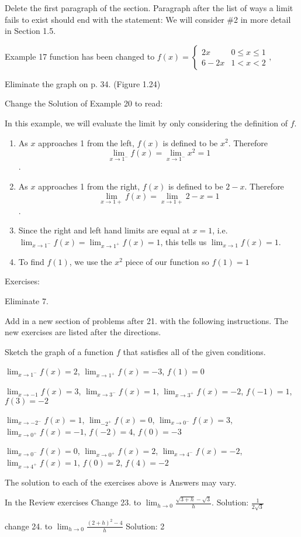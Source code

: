 \documentclass[10pt]{article}
\newcommand{\ds}{\displaystyle}
\begin{document}
Delete the first paragraph of the section.  Paragraph after the list of ways a limit fails to exist should end with the statement: We will consider \#2 in more detail in Section 1.5.  %




Example 17 function has been changed to  $\ds f(x) = \begin{cases} 2x & 0\leq x\leq 1 \\ 6-2x & 1<x<2\end{cases},$

Eliminate the graph on p. 34. (Figure 1.24)

Change the Solution of Example 20 to read:

In this example, we will evaluate the limit by only considering the definition of $f$.
		\begin{enumerate}
		\item		As $x$ approaches 1 from the left, $f(x)$ is defined to be $x^2$. Therefore $$\lim_{x\to1^-} f(x)=\lim_{x\to1^-} x^2=1$$.
		\item		As $x$ approaches 1 from the right, $f(x)$ is defined to be $2-x$. Therefore $$ \lim_{x\to 1+} f(x)=\lim_{x\to 1+} 2-x=1$$.
		\item		Since the right and left hand limits are equal at $x=1$, i.e. $\ds \lim_{x\to1^-} f(x)=\ds \lim_{x\to1^+} f(x)=1$, this tells us $\ds \lim_{x\to1} f(x)=1$.
		\item		To find $f(1)$, we use the $x^2$ piece of our function so $f(1)=1$ 		
		\end{enumerate}


Exercises:

Eliminate 7.


Add in a new section of problems after 21. with the following instructions.  The new exercises are listed after the directions.

Sketch the graph of a function $f$ that satisfies all of the given conditions.

$\ds \lim_{x\to 1^-} f(x)=2$, \quad $\ds \lim_{x\to 1^+} f(x)=-3$, \quad $f(1)=0$

$\ds \lim_{x\to -1} f(x)=3$, \quad $\ds \lim_{x\to 3^-} f(x)=1$, \quad $\ds \lim_{x\to 3^+} f(x)=-2$, \quad $f(-1)=1$, \quad $f(3)=-2$

$\ds \lim_{x\to -2^-} f(x)=1$, \quad  $\ds \lim_{-2^+} f(x)=0$, \quad $\ds \lim_{x\to 0^-} f(x)=3$, \quad $\ds \lim_{x\to 0^+} f(x)=-1$, \quad $f(-2)=4$, \quad $f(0)=-3$

$\ds \lim_{x\to 0^-} f(x)=0$, \quad $\ds \lim_{x\to 0^+} f(x)=2$, \quad $\ds \lim_{x\to 4^-} f(x)=-2$, \quad $\ds \lim_{x\to 4^+} f(x)=1$, \quad $f(0)=2$, \quad $f(4)=-2$

The solution to each of the exercises above is        Answers may vary.


In the Review exercises
	Change 23. to $\ds \lim_{h\to 0} \frac{\sqrt{3+h}-\sqrt{3}}{h}$.  Solution: $\frac{1}{2\sqrt{3}}$


	 change 24. to $\ds \lim_{h\to 0} \frac{(2+h)^2-4}{h}$  Solution: 2
\end{document}
